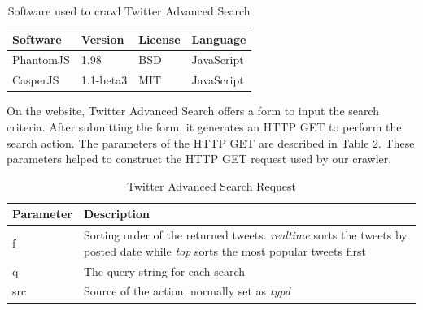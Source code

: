 \begin{table}
\caption{Software used to crawl Twitter Advanced Search}
\label{table:crawlerSoftware}
\centering
\begin{tabular}{|l|l|l|l|}

\hline
\textbf{Software} & \textbf{Version} & \textbf{License} & \textbf{Language} \\ \hline \hline
PhantomJS & 1.98 & BSD & JavaScript \\ \hline
CasperJS & 1.1-beta3 & MIT & JavaScript \\ \hline

\end{tabular}
\end{table}

On the website, Twitter Advanced Search offers a form to input the search criteria. After submitting the form, it generates an HTTP GET to perform the search action. The parameters of the HTTP GET are described in Table \ref{table:crawlerRequest}. These parameters helped to construct the HTTP GET request used by our crawler.

\begin{table}
\caption{Twitter Advanced Search Request}
\label{table:crawlerRequest}
\centering
\begin{tabular}{|p{2cm}|p{10cm}|}

\hline
\textbf{Parameter} & \textbf{Description} \\ \hline \hline
f & Sorting order of the returned tweets. \textit{realtime} sorts the tweets by posted date while \textit{top} sorts the most popular tweets first \\ \hline
q & The query string for each search \\ \hline
src & Source of the action, normally set as \textit{typd} \\ \hline
\end{tabular}
\end{table}

